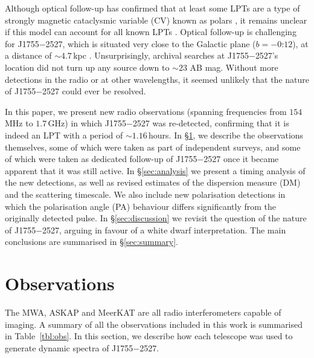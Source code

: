 \documentclass[fleqn,usenatbib]{mnras}
\newcommand{\src}{J1755$-$2527}
\newcommand{\Tab}{Table}
\begin{document}
Although optical follow-up has confirmed that at least some LPTs are a type of strongly magnetic cataclysmic variable (CV) known as polars \citep{deRuiter2025,2024ApJ...976L..21H,2025A&A...695L...8R}, it remains unclear if this model can account for all known LPTs \citep[e.g.][]{2022ApJ...940...72R,Lee2025}.
Optical follow-up is challenging for \src{}, which is situated very close to the Galactic plane ($b = -0\overset{\circ}{.}12$), at a distance of ${\sim}4.7\,$kpc .
Unsurprisingly, archival searches at \src{}'s location did not turn up any source down to ${\sim}23$ AB mag.
Without more detections in the radio or at other wavelengths, it seemed unlikely that the nature of \src{} could ever be resolved.

In this paper, we present new radio observations (spanning frequencies from $154\,$MHz to $1.7\,$GHz) in which \src{} was re-detected, confirming that it is indeed an LPT with a period of ${\sim}1.16\,$hours.
In \S\ref{sec:observations}, we describe the observations themselves, some of which were taken as part of independent surveys, and some of which were taken as dedicated follow-up of \src{} once it became apparent that it was still active.
In \S\ref{sec:analysis} we present a timing analysis of the new detections, as well as revised estimates of the dispersion measure (DM) and the scattering timescale.
We also include new polarisation detections in which the polarisation angle (PA) behaviour differs significantly from the originally detected pulse.
In \S\ref{sec:discussion} we revisit the question of the nature of \src{}, arguing in favour of a white dwarf interpretation.
The main conclusions are summarised in \S\ref{sec:summary}.

\section{Observations} \label{sec:observations}

The MWA, ASKAP and MeerKAT are all radio interferometers capable of imaging.
A summary of all the observations included in this work is summarised in \Tab~\ref{tbl:obs}.
In this section, we describe how each telescope was used to generate dynamic spectra of \src{}.
\end{document}
